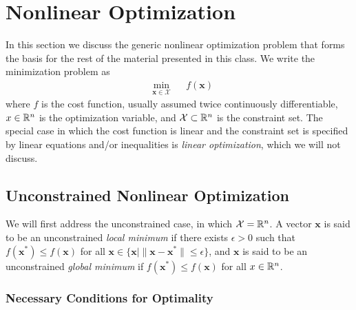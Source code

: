 \section{Nonlinear Optimization}

In this section we discuss the generic nonlinear optimization problem that forms the basis for the rest of the material presented in this class. We write the minimization problem as 
\begin{equation*}
\begin{aligned}
& \underset{\bm{x} \in \mathcal{X}}{\min}
& & f(\bm{x})
\end{aligned}
\end{equation*}
where $f$ is the cost function, usually assumed twice continuously differentiable, $x \in \mathbb{R}^n$ is the optimization variable, and $\mathcal{X} \subset \mathbb{R}^n$ is the constraint set. The special case in which the cost function is linear and the constraint set is specified by linear equations and/or inequalities is \textit{linear optimization}, which we will not discuss. 

\subsection{Unconstrained Nonlinear Optimization}

We will first address the unconstrained case, in which $\mathcal{X} = \mathbb{R}^n$. A vector $\bm{x}$ is said to be an unconstrained \textit{local minimum} if there exists $\epsilon > 0$ such that $f(\bm{x}^*) \leq f(\bm{x})$ for all $\bm{x} \in \{\bm{x} \mid \|\bm{x} - \bm{x}^*\| \leq \epsilon\}$, and $\bm{x}$ is said to be an unconstrained \textit{global minimum} if $f(\bm{x}^*) \leq f(\bm{x})$ for all $x \in \mathbb{R}^n$. 

\subsubsection{Necessary Conditions for Optimality}

